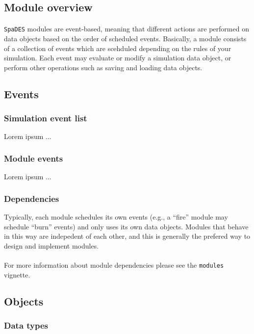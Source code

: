 \documentclass{article}
\begin{document}
\subsection{Module overview}

\paragraph{}
\texttt{SpaDES} modules are event-based, meaning that different actions are performed on data objects based on the order of scheduled events. Basically, a module consists of a collection of events which are scehduled depending on the rules of your simulation. Each event may evaluate or modify a simulation data object, or perform other operations such as saving and loading data objects.

\subsection{Events}

\subsubsection{Simulation event list}
Lorem ipsum ...

\subsubsection{Module events}
Lorem ipsum ...

\subsubsection{Dependencies}
Typically, each module schedules its own events (e.g., a ``fire'' module may schedule ``burn'' events) and only uses its own data objects. Modules that behave in this way are indepedent of each other, and this is generally the prefered way to design and implement modules.

\paragraph{}
For more information about module dependencies please see the \texttt{modules} vignette.

\subsection{Objects}

\subsubsection{Data types}
\end{document}
